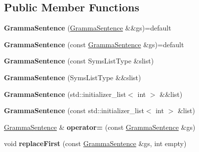 \subsection*{Public Member Functions}
\begin{DoxyCompactItemize}
\item 
\mbox{\label{classx2_1_1_gramma_sentence_aebcf626920630103d5f5a48a00eb57a4}} 
{\bfseries Gramma\+Sentence} (\hyperlink{classx2_1_1_gramma_sentence}{Gramma\+Sentence} \&\&gs)=default
\item 
\mbox{\label{classx2_1_1_gramma_sentence_a90e50f2cf45081bc11d5ff18ab7913b8}} 
{\bfseries Gramma\+Sentence} (const \hyperlink{classx2_1_1_gramma_sentence}{Gramma\+Sentence} \&gs)=default
\item 
\mbox{\label{classx2_1_1_gramma_sentence_aff4e3d88d7166fc7a3748df2b66109c2}} 
{\bfseries Gramma\+Sentence} (const Syms\+List\+Type \&slist)
\item 
\mbox{\label{classx2_1_1_gramma_sentence_aa407f65f300d881bc9225d12488325ea}} 
{\bfseries Gramma\+Sentence} (Syms\+List\+Type \&\&slist)
\item 
\mbox{\label{classx2_1_1_gramma_sentence_a1f857ae143012e35a8021714c9236ead}} 
{\bfseries Gramma\+Sentence} (std\+::initializer\+\_\+list$<$ int $>$ \&\&list)
\item 
\mbox{\label{classx2_1_1_gramma_sentence_acce42463db9a6c6d78454f49c579ac11}} 
{\bfseries Gramma\+Sentence} (const std\+::initializer\+\_\+list$<$ int $>$ \&list)
\item 
\mbox{\label{classx2_1_1_gramma_sentence_ac71133dec3e7bb06253e32982e7add31}} 
\hyperlink{classx2_1_1_gramma_sentence}{Gramma\+Sentence} \& {\bfseries operator=} (const \hyperlink{classx2_1_1_gramma_sentence}{Gramma\+Sentence} \&gs)
\item 
\mbox{\label{classx2_1_1_gramma_sentence_a695af7767ca769144cbaafc7714d7976}} 
void {\bfseries replace\+First} (const \hyperlink{classx2_1_1_gramma_sentence}{Gramma\+Sentence} \&gs, int empty)

\end{DoxyCompactItemize}
